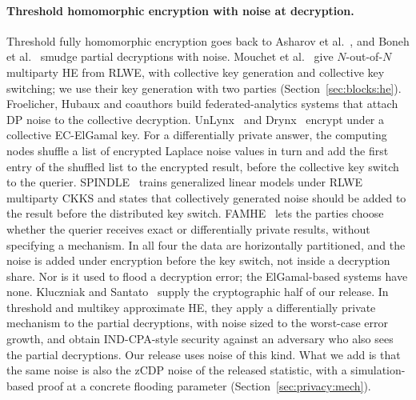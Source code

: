 \documentclass[11pt]{article}
\theoremstyle{definition}
\theoremstyle{plain}
\begin{document}
\paragraph{Threshold homomorphic encryption with noise at decryption.} Threshold fully homomorphic encryption goes back to Asharov et al.~\cite{asharov2012multiparty}, and Boneh et al.~\cite{boneh2018threshold} smudge partial decryptions with noise. Mouchet et al.~\cite{mouchet2021multiparty} give $N$-out-of-$N$ multiparty HE from RLWE, with collective key generation and collective key switching; we use their key generation with two parties (Section~\ref{sec:blocks:he}). Froelicher, Hubaux and coauthors build federated-analytics systems that attach DP noise to the collective decryption. UnLynx~\cite{froelicher2017unlynx} and Drynx~\cite{froelicher2020drynx} encrypt under a collective EC-ElGamal key. For a differentially private answer, the computing nodes shuffle a list of encrypted Laplace noise values in turn and add the first entry of the shuffled list to the encrypted result, before the collective key switch to the querier. SPINDLE~\cite{froelicher2021scalable} trains generalized linear models under RLWE multiparty CKKS and states that collectively generated noise should be added to the result before the distributed key switch. FAMHE~\cite{froelicher2021truly} lets the parties choose whether the querier receives exact or differentially private results, without specifying a mechanism. In all four the data are horizontally partitioned, and the noise is added under encryption before the key switch, not inside a decryption share. Nor is it used to flood a decryption error; the ElGamal-based systems have none. Kluczniak and Santato~\cite{kluczniak2025circuit} supply the cryptographic half of our release. In threshold and multikey approximate HE, they apply a differentially private mechanism to the partial decryptions, with noise sized to the worst-case error growth, and obtain IND-CPA-style security against an adversary who also sees the partial decryptions. Our release uses noise of this kind. What we add is that the same noise is also the zCDP noise of the released statistic, with a simulation-based proof at a concrete flooding parameter (Section~\ref{sec:privacy:mech}).
\end{document}
